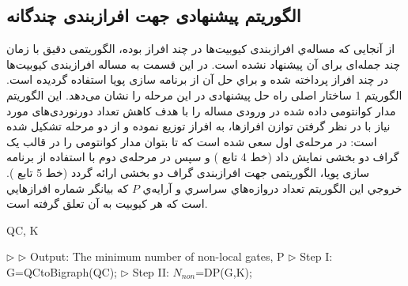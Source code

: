 \subsection{الگوریتم پیشنهادی جهت افرازبندی چندگانه }
از آنجایی که مساله‌ي افرازبندی کیوبیت‌ها در چند افراز  بوده، الگوریتمی دقیق با زمان چند جمله‌ای برای آن پیشنهاد نشده است. در این قسمت به مساله افرازبندی کیوبیت‌ها در چند افراز پرداخته شده و براي حل آن  از برنامه سازی پویا استفاده گرديده است. الگوریتم 1 ساختار اصلی راه حل پیشنهادی در این مرحله را نشان می‌دهد. این الگوریتم مدار کوانتومی داده شده در ورودی مساله را با هدف کاهش تعداد دورنوردی‌های مورد نیاز با در نظر گرفتن توازن افرازها، به  افراز توزیع نموده و از دو مرحله تشکیل شده است: در مرحله‌ی اول سعی شده است که تا بتوان مدار کوانتومی را در قالب یک گراف دو بخشی نمایش داد (خط 4 تابع ) و سپس در مرحله‌ی دوم با استفاده از برنامه سازی پویا، الگوریتمی جهت افرازبندی گراف دو بخشی ارائه گردد (خط 5 تابع ). خروجي اين الگوريتم تعداد دروازه‌هاي سراسري و آرايه‌ي $P$ كه بيانگر شماره افرازهايي است كه هر كيوبيت به آن تعلق گرفته است.
\begin{latin}
\begin{algorithm}
{
\fontsize{9}{1}
\caption{}
\begin{algorithmic}[1]
 {QC, K}

\State\textcolor[rgb]{0.00,0.50,1.00}{ $\triangleright$ }
\State\textcolor[rgb]{0.00,0.50,1.00}{ $\triangleright$ Output: The minimum number of non-local gates, P }
\State \textcolor[rgb]{0.00,0.50,1.00}{ $\triangleright$ Step I:} G=QCtoBigraph(QC);
\State \textcolor[rgb]{0.00,0.50,1.00}{ $\triangleright$ Step II:}  $N_{non}$=DP(G,K);

\EndFunction
\end{algorithmic}
}

\end{algorithm}
\end{latin}
